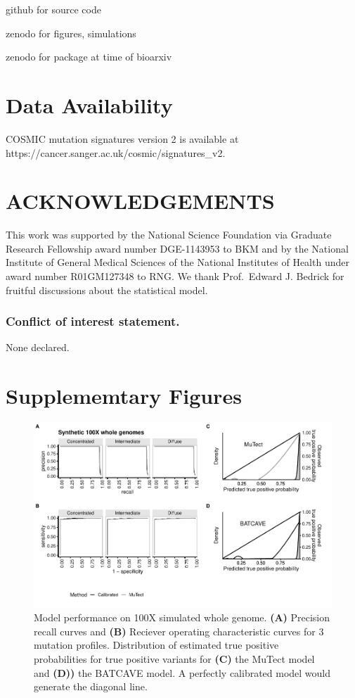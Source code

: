 \documentclass[a4,center,fleqn]{NAR}
\newcommand{\batcave}{BATCAVE\xspace}
\newcommand{\beginsupplement}{%
        \clearpage
        \onecolumn
        \setcounter{table}{0}
        \renewcommand{\thetable}{S\arabic{table}}%
        \setcounter{figure}{0}
        \renewcommand{\thefigure}{S\arabic{figure}}%
     }
\begin{document}
github for source code

zenodo for figures, simulations

zenodo for package at time of bioarxiv

\section{Data Availability}
COSMIC mutation signatures version 2 is available at \footnotesize{https://cancer.sanger.ac.uk/cosmic/signatures\_v2}.



\section{ACKNOWLEDGEMENTS}

This work was supported by the National Science Foundation via Graduate Research Fellowship award number DGE-1143953 to BKM and by the National Institute of General Medical Sciences of the National Institutes of Health under award number R01GM127348 to RNG.
We thank Prof.\ Edward J. Bedrick for fruitful discussions about the statistical model.

\subsubsection{Conflict of interest statement.} None declared.



\beginsupplement
\section{Supplememtary Figures}

\begin{figure}[b]
  \begin{center}
  \includegraphics[width=\textwidth]{figures/fig_wgs.pdf}
  \end{center}
  \caption{Model performance on 100X simulated whole genome.
  \textbf{(A)} Precision recall curves and \textbf{(B)} Reciever operating characteristic curves for 3 mutation profiles.
  Distribution of estimated true positive probabilities for true positive  variants for \textbf{(C)} the MuTect model and \textbf{(D))} the \batcave model.
  A perfectly calibrated model would generate the diagonal line.}
\label{NAR-wgs_fig}
\end{figure}
\end{document}
